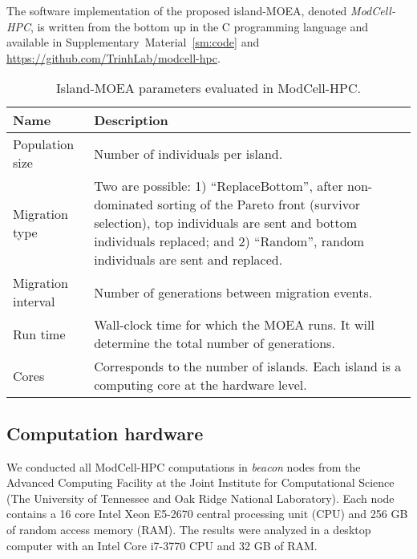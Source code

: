 {The software implementation of the proposed island-MOEA, denoted \textit{ModCell-HPC}, is written from the bottom up in the C programming language and available in Supplementary~Material~\ref{sm:code} and \url{https://github.com/TrinhLab/modcell-hpc}.

\begin{table}[h]
    \caption{Island-MOEA parameters evaluated in ModCell-HPC.}
    \centering
    \begin{tabular}{lp{13cm}}
        \toprule
        Name                & Description   \\
        \midrule
        Population size     & Number of individuals per island.  \\
        Migration type      & Two are possible: 1) ``ReplaceBottom'', after non-dominated sorting of the Pareto front\citep{deb2002} (survivor selection), top individuals are sent and bottom individuals replaced; and 2) ``Random'', random individuals are sent and replaced.  \\
        Migration interval  & Number of generations between migration events.    \\
        Run time            & Wall-clock time for which the MOEA runs. It will determine the total number of generations.   \\
        Cores               & Corresponds to the number of islands. Each island is a computing core at the hardware level. \\
        \hline
    \end{tabular}
    \label{tab7:parameters}
\end{table}





\subsection{Computation hardware}
We conducted all ModCell-HPC computations in \emph{beacon} nodes from the Advanced Computing Facility at the Joint Institute for Computational Science (The University of Tennessee and Oak Ridge National Laboratory). Each node contains a 16 core Intel Xeon E5-2670 central processing unit (CPU) and 256 GB of random access memory (RAM). The results were analyzed in a desktop computer with an Intel Core i7-3770 CPU and 32 GB of RAM.

}

